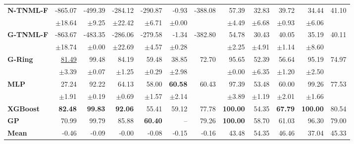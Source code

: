 \begin{table}[!htbp]
\begin{tabular}{lrrrrrr||rrrrr}
\midrule
\textbf{N-TNML-F} & -865.07 & -499.39 & -284.12 & -290.87 & -0.93 & -388.08 & 57.39 & 32.83 & 39.72 & 34.44 & 41.10 \\
 & $\pm$18.64 & $\pm$9.25 & $\pm$22.42 & $\pm$6.71 & $\pm$0.00 &  & $\pm$4.49 & $\pm$6.68 & $\pm$0.93 & $\pm$6.06 &  \\
\midrule
\textbf{G-TNML-F} & -863.67 & -483.35 & -286.06 & -279.58 & -1.34 & -382.80 & 54.78 & 30.43 & 40.05 & 35.19 & 40.11 \\
 & $\pm$18.74 & $\pm$0.00 & $\pm$22.69 & $\pm$4.57 & $\pm$0.28 &  & $\pm$2.25 & $\pm$4.91 & $\pm$1.14 & $\pm$8.60 &  \\
\midrule
\textbf{G-Ring} & \underline{81.49} & 99.48 & 84.19 & 59.48 & 38.85 & 72.70 & 95.65 & 52.39 & 56.64 & 95.19 & 74.97 \\
 & $\pm$3.39 & $\pm$0.07 & $\pm$1.25 & $\pm$0.29 & $\pm$2.98 &  & $\pm$0.00 & $\pm$6.35 & $\pm$1.20 & $\pm$2.50 &  \\
\midrule
\textbf{MLP} & 27.24 & 92.22 & 64.13 & 58.00 & \textbf{60.58} & 60.43 & 97.39 & 53.48 & 60.00 & 99.26 & 77.53 \\
 & $\pm$1.91 & $\pm$0.19 & $\pm$0.69 & $\pm$1.57 & $\pm$2.14 &  & $\pm$3.89 & $\pm$1.19 & $\pm$2.01 & $\pm$1.66 &  \\
\midrule
\textbf{XGBoost} & \textbf{82.48} & \textbf{99.83} & \textbf{92.06} & 55.41 & 59.12 & 77.78 & \textbf{100.00} & 54.35 & \textbf{67.79} & \textbf{100.00} & 80.54 \\
\midrule
\textbf{GP} & 70.99 & 99.79 & 85.88 & \textbf{60.40} & -- & 79.26 & \textbf{100.00} & 58.70 & 61.03 & 96.30 & 79.00 \\
\midrule
\textbf{Mean} & -0.46 & -0.09 & -0.00 & -0.08 & -0.15 & -0.16 & 43.48 & 54.35 & 46.46 & 37.04 & 45.33 \\
\bottomrule
\end{tabular}
\end{table}